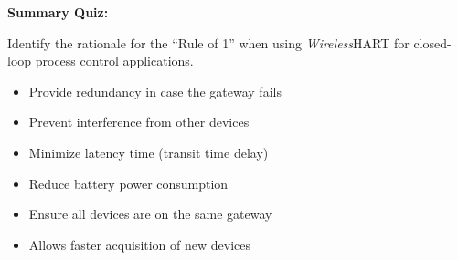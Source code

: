 \vfil \eject

\noindent
{\bf Summary Quiz:}

Identify the rationale for the ``Rule of 1'' when using {\sl Wireless}HART for closed-loop process control applications.

\begin{itemize}
\item{} Provide redundancy in case the gateway fails
\vskip 5pt 
\item{} Prevent interference from other devices
\vskip 5pt 
\item{} Minimize latency time (transit time delay) 
\vskip 5pt 
\item{} Reduce battery power consumption
\vskip 5pt 
\item{} Ensure all devices are on the same gateway
\vskip 5pt 
\item{} Allows faster acquisition of new devices
\end{itemize}





